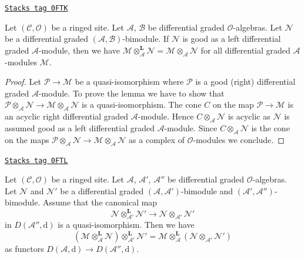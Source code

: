 \begin{lemma}
\label{sdga-lemma-good-on-other-side}
\href{https://stacks.math.columbia.edu/tag/0FTK}{\texttt{Stacks tag 0FTK}}

Let $(\mathcal{C}, \mathcal{O})$ be a ringed site. Let
$\mathcal{A}$, $\mathcal{B}$ be differential graded $\mathcal{O}$-algebras.
Let $\mathcal{N}$ be a  differential graded
$(\mathcal{A}, \mathcal{B})$-bimodule. If $\mathcal{N}$ is good
as a left differential graded $\mathcal{A}$-module, then
we have $\mathcal{M} \otimes_\mathcal{A}^\mathbf{L} \mathcal{N} =
\mathcal{M} \otimes_\mathcal{A} \mathcal{N}$ for all
differential graded $\mathcal{A}$-modules $\mathcal{M}$.
\end{lemma}

\begin{proof}
Let $\mathcal{P} \to \mathcal{M}$ be a quasi-isomorphism where
$\mathcal{P}$ is a good (right) differential graded $\mathcal{A}$-module.
To prove the lemma we have to show that
$\mathcal{P} \otimes_\mathcal{A} \mathcal{N} \to
\mathcal{M} \otimes_\mathcal{A} \mathcal{N}$
is a quasi-isomorphism. The cone $C$ on the map
$\mathcal{P} \to \mathcal{M}$ is an acyclic right differential
graded $\mathcal{A}$-module. Hence
$C \otimes_\mathcal{A} \mathcal{N}$ is acyclic as $\mathcal{N}$
is assumed good as a left differential graded $\mathcal{A}$-module.
Since $C \otimes_\mathcal{A} \mathcal{N}$ is the cone on the
maps $\mathcal{P} \otimes_\mathcal{A} \mathcal{N} \to
\mathcal{M} \otimes_\mathcal{A} \mathcal{N}$ as a complex
of $\mathcal{O}$-modules we conclude.
\end{proof}

\begin{lemma}
\label{sdga-lemma-compose-tensor}
\href{https://stacks.math.columbia.edu/tag/0FTL}{\texttt{Stacks tag 0FTL}}

Let $(\mathcal{C}, \mathcal{O})$ be a ringed site. Let
$\mathcal{A}$, $\mathcal{A}'$, $\mathcal{A}''$ be differential graded
$\mathcal{O}$-algebras. Let $\mathcal{N}$ and $\mathcal{N}'$ be a
differential graded $(\mathcal{A}, \mathcal{A}')$-bimodule
and $(\mathcal{A}', \mathcal{A}'')$-bimodule. Assume
that the canonical map
$$
\mathcal{N} \otimes_{\mathcal{A}'}^\mathbf{L} \mathcal{N}'
\longrightarrow
\mathcal{N} \otimes_{\mathcal{A}'} \mathcal{N}'
$$
in $D(\mathcal{A}'', \text{d})$ is a quasi-isomorphism.
Then we have
$$
(\mathcal{M}
\otimes_\mathcal{A}^\mathbf{L} \mathcal{N})
\otimes_{\mathcal{A}'}^\mathbf{L} \mathcal{N}'
=
\mathcal{M}
\otimes_\mathcal{A}^\mathbf{L}
(\mathcal{N} \otimes_{\mathcal{A}'} \mathcal{N}')
$$
as functors $D(\mathcal{A}, \text{d}) \to D(\mathcal{A}'', \text{d})$.
\end{lemma}

